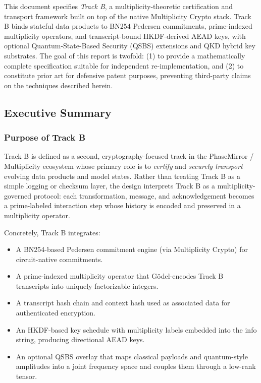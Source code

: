 \documentclass[11pt]{article}
\begin{document}
This document specifies \emph{Track B}, a multiplicity-theoretic certification and transport framework built on top of the native Multiplicity Crypto stack.
Track B binds stateful data products to BN254 Pedersen commitments, prime-indexed multiplicity operators, and transcript-bound HKDF-derived AEAD keys, with optional Quantum-State-Based Security (QSBS) extensions and QKD hybrid key substrates.
The goal of this report is twofold:
(1) to provide a mathematically complete specification suitable for independent re-implementation, and
(2) to constitute prior art for defensive patent purposes, preventing third-party claims on the techniques described herein.

\subsection{Executive Summary}

\subsubsection{Purpose of Track B}

Track B is defined as a second, cryptography-focused track in the PhaseMirror / Multiplicity ecosystem whose primary role is to \emph{certify} and \emph{securely transport} evolving data products and model states.
Rather than treating Track B as a simple logging or checksum layer, the design interprets Track B as a multiplicity-governed protocol:
each transformation, message, and acknowledgement becomes a prime-labeled interaction step whose history is encoded and preserved in a multiplicity operator.

Concretely, Track B integrates:
\begin{itemize}[leftmargin=1.5em]
  \item A BN254-based Pedersen commitment engine (via Multiplicity Crypto) for circuit-native commitments.
  \item A prime-indexed multiplicity operator that G\"odel-encodes Track B transcripts into uniquely factorizable integers.
  \item A transcript hash chain and context hash used as associated data for authenticated encryption.
  \item An HKDF-based key schedule with multiplicity labels embedded into the info string, producing directional AEAD keys.
  \item An optional QSBS overlay that maps classical payloads and quantum-style amplitudes into a joint frequency space and couples them through a low-rank tensor.
\end{itemize}
\end{document}
